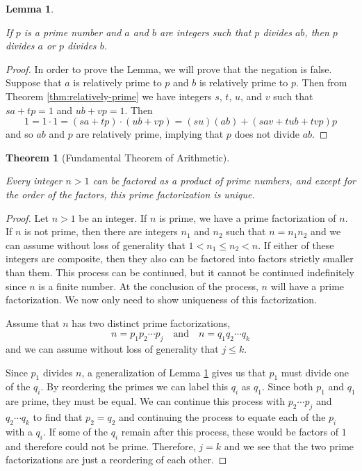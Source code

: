 \documentclass[
]{book}
\newtheorem{theorem}{Theorem}[chapter]
\newtheorem{lemma}{Lemma}[chapter]
\theoremstyle{definition}
\theoremstyle{definition}
\theoremstyle{definition}
\theoremstyle{definition}
\theoremstyle{remark}
\begin{document}
\begin{lemma}
\protect\hypertarget{lem:prime-lemma}{}\label{lem:prime-lemma}

If \(p\) is a prime number and \(a\) and \(b\) are integers such that \(p\) divides \(ab\), then \(p\) divides \(a\) or \(p\) divides \(b\).

\end{lemma}

\begin{proof}

In order to prove the Lemma, we will prove that the negation is false. Suppose that \(a\) is relatively prime to \(p\) and \(b\) is relatively prime to \(p\). Then from Theorem \ref{thm:relatively-prime} we have integers \(s\), \(t\), \(u\), and \(v\) such that \(sa+tp=1\) and \(ub+vp=1\). Then
\[1= 1 \cdot 1 = (sa+tp)\cdot (ub+vp) = (su)(ab)+(sav+tub+tvp)p\] and so \(ab\) and \(p\) are relatively prime, implying that \(p\) does not divide \(ab\).

\end{proof}

\begin{theorem}[Fundamental Theorem of Arithmetic]
\protect\hypertarget{thm:unlabeled-div-110}{}\label{thm:unlabeled-div-110}

Every integer \(n>1\) can be factored as a product of prime numbers, and except for the order of the factors, this prime factorization is unique.

\end{theorem}

\begin{proof}

Let \(n>1\) be an integer. If \(n\) is prime, we have a prime factorization of \(n\). If \(n\) is not prime, then there are integers \(n_1\) and \(n_2\) such that \(n=n_1 n_2\) and we can assume without loss of generality that \(1<n_1\leq n_2<n\). If either of these integers are composite, then they also can be factored into factors strictly smaller than them. This process can be continued, but it cannot be continued indefinitely since \(n\) is a finite number. At the conclusion of the process, \(n\) will have a prime factorization. We now only need to show uniqueness of this factorization.

Assume that \(n\) has two distinct prime factorizations,
\[n=p_1 p_2 \cdots p_j \quad \mbox{and} \quad n=q_1 q_2 \cdots q_k\] and we can assume without loss of generality that \(j\leq k\).

Since \(p_1\) divides \(n\), a generalization of Lemma \ref{lem:prime-lemma} gives us that \(p_1\) must divide one of the \(q_i\). By reordering the primes we can label this \(q_i\) as \(q_1\). Since both \(p_1\) and \(q_1\) are prime, they must be equal. We can continue this process with \(p_2 \cdots p_j\) and \(q_2\cdots q_k\) to find that \(p_2=q_2\) and continuing the process to equate each of the \(p_i\) with a \(q_i\). If some of the \(q_i\) remain after this process, these would be factors of \(1\) and therefore could not be prime. Therefore, \(j=k\) and we see that the two prime factorizations are just a reordering of each other.

\end{proof}
\end{document}
